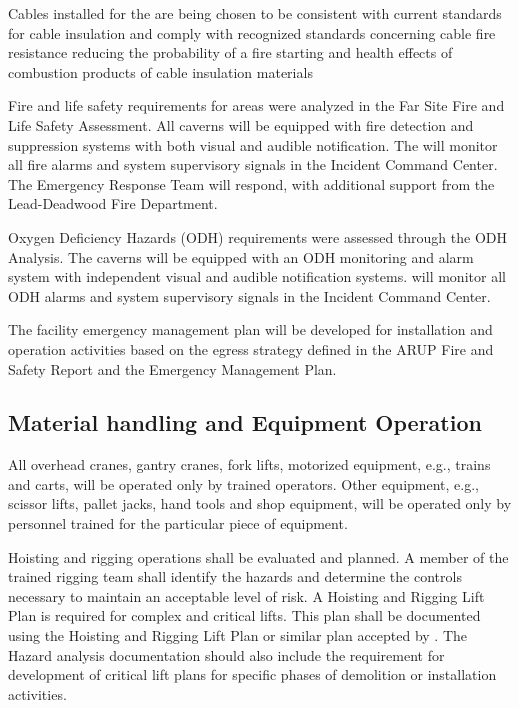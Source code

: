 Cables installed for the  are being chosen to be
consistent with current \fnal standards for cable insulation and
comply with recognized standards concerning cable fire resistance
reducing the probability of a fire starting and health effects of
combustion products of cable insulation materials

Fire and life safety requirements for  areas
were analyzed in the  Far Site Fire and Life
Safety Assessment. All caverns will be equipped with fire detection
and suppression systems with both visual and audible notification. The
 will monitor all fire alarms and system supervisory signals in
the  Incident Command Center.  The  Emergency Response Team
will respond, with additional support from the Lead-Deadwood Fire
Department.

Oxygen Deficiency Hazards (ODH) requirements were assessed through the
 ODH Analysis. The caverns will be equipped
with an ODH monitoring and alarm system with independent visual and
audible notification systems.  will monitor all ODH alarms and
system supervisory signals in the  Incident Command Center.

The facility emergency management plan will be developed for
installation and operation activities based on the egress strategy
defined in the ARUP Fire and Safety Report and the  Emergency
Management Plan.

\subsection{Material handling and Equipment Operation}

All overhead cranes, gantry cranes, fork lifts, motorized equipment,
e.g., trains and carts, will be operated only by trained
operators. Other equipment, e.g., scissor lifts, pallet jacks, hand
tools and shop equipment, will be operated only by personnel trained
for the particular piece of equipment.

Hoisting and rigging operations shall be evaluated and planned.  A
member of the trained rigging team shall identify the hazards and
determine the controls necessary to maintain an acceptable level of
risk.  A Hoisting and Rigging Lift Plan is required for complex and
critical lifts. This plan shall be documented using the \fnal Hoisting
and Rigging Lift Plan or similar plan accepted by \fnal. The Hazard
analysis documentation should also include the requirement for
development of critical lift plans for specific phases of demolition
or installation activities.

